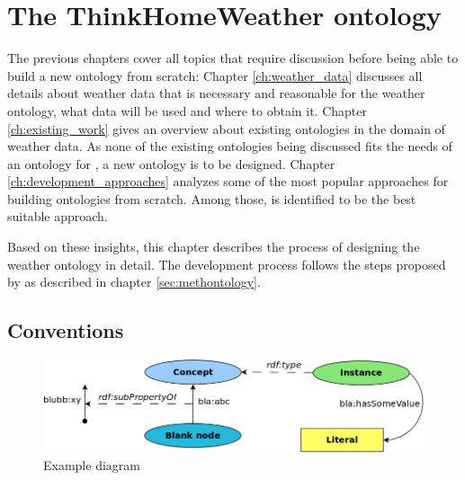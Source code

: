 \chapter{The ThinkHomeWeather ontology}
\label{ch:thinkhomeweather_ontology}






The previous chapters cover all topics that require discussion before being able to build a new ontology from scratch: Chapter \ref{ch:weather_data} discusses all details about weather data that is necessary and reasonable for the \thinkhome weather ontology, what data will be used and where to obtain it. Chapter \ref{ch:existing_work} gives an overview about existing ontologies in the domain of weather data. As none of the existing ontologies being discussed fits the needs of an ontology for \thinkhome, a new ontology is to be designed. Chapter \ref{ch:development_approaches} analyzes some of the most popular approaches for building ontologies from scratch. Among those, \methontology \cite{Methontology} is identified to be the best suitable approach.

Based on these insights, this chapter describes the process of designing the \thinkhome weather ontology in detail. The development process follows the steps proposed by \methontology as described in chapter \ref{sec:methontology}.

\section*{Conventions}

\begin{figure}
  \includegraphics[width=\textwidth]{figures/diagrams/template.png}
  \caption{Example diagram}
  \label{fig:diagram_example}
\end{figure}

